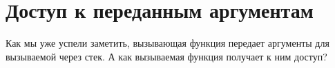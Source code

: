 \section{Доступ к переданным аргументам}
\myindex{\Stack}

Как мы уже успели заметить, вызывающая функция передает аргументы для вызываемой через стек. 
А как вызываемая функция получает к ним доступ?









